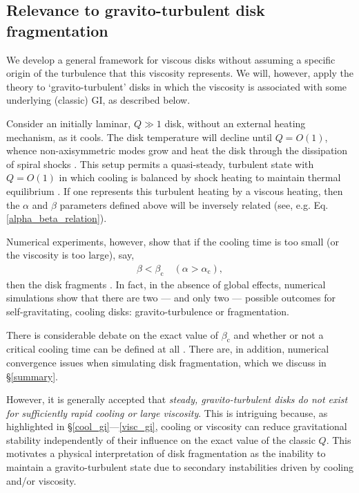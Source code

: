 \documentclass[iop, numberedappendix]{emulateapj}
\begin{document}

\subsection{Relevance to gravito-turbulent disk fragmentation}\label{frag_intro}
We develop a general framework for viscous disks without  
assuming a specific origin of the turbulence that this viscosity 
represents. 
We will, however, apply the theory to `gravito-turbulent'
disks in which the viscosity is associated with some underlying
(classic) GI, as described below.  

Consider an initially laminar, $Q\gg1$ disk, without an external
heating mechanism, as it cools. The disk temperature will decline
until $Q=O(1)$, whence non-axisymmetric modes grow and heat the disk
through the dissipation of spiral shocks \citep{cossins09}. 
This setup permits a quasi-steady, turbulent state with
$Q =O(1)$ in which cooling is balanced by shock heating to maintain
thermal equilibrium \citep{gammie01}. 
If one represents this turbulent heating by a viscous heating, then
the $\alpha$ and $\beta$ parameters defined above will  
be inversely related (see, e.g. Eq. \ref{alpha_beta_relation}).   

Numerical experiments, however, show that if the cooling time is too
small (or the viscosity is too large), say,   
\begin{align}\label{frag_cond}
  \beta < \beta_\mathrm{c} \quad
  \left(\alpha>\alpha_\mathrm{c}\right), 
\end{align}
then the disk fragments \citep{gammie01,rice05,rice11}. In fact, in 
the absence of global effects, numerical simulations show that there are
two --- and only two --- possible outcomes for self-gravitating,
cooling disks: gravito-turbulence or fragmentation. 

There is considerable debate on the exact value of $\beta_\mathrm{c}$  
and whether or not a critical cooling time can be defined at all
\citep{meru11,lodato11,meru12,paardekooper12,hopkins13}. There are, in
addition, numerical convergence issues when simulating disk  
fragmentation, which we discuss in \S\ref{summary}. 

However, it is generally accepted that \emph{steady, gravito-turbulent
  disks do not  
  exist for sufficiently rapid cooling or large viscosity}.  
This is intriguing because, as highlighted in
\S\ref{cool_gi}---\ref{visc_gi}, cooling or viscosity can reduce 
gravitational stability independently of their influence on the exact
value of the classic $Q$. This motivates a physical      
interpretation of disk fragmentation as the inability to maintain a
gravito-turbulent state due to 
secondary instabilities driven by cooling and/or viscosity.
\end{document}

